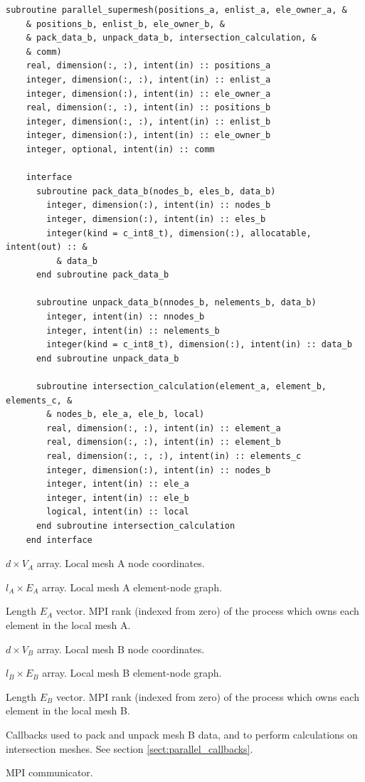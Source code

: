 \documentclass{article}
\begin{document}
\begin{lstlisting}[language=FORTRAN]
  subroutine parallel_supermesh(positions_a, enlist_a, ele_owner_a, &
    & positions_b, enlist_b, ele_owner_b, &
    & pack_data_b, unpack_data_b, intersection_calculation, &
    & comm)
    real, dimension(:, :), intent(in) :: positions_a
    integer, dimension(:, :), intent(in) :: enlist_a
    integer, dimension(:), intent(in) :: ele_owner_a
    real, dimension(:, :), intent(in) :: positions_b
    integer, dimension(:, :), intent(in) :: enlist_b
    integer, dimension(:), intent(in) :: ele_owner_b
    integer, optional, intent(in) :: comm
    
    interface
      subroutine pack_data_b(nodes_b, eles_b, data_b)
        integer, dimension(:), intent(in) :: nodes_b
        integer, dimension(:), intent(in) :: eles_b
        integer(kind = c_int8_t), dimension(:), allocatable, intent(out) :: &
          & data_b
      end subroutine pack_data_b

      subroutine unpack_data_b(nnodes_b, nelements_b, data_b)
        integer, intent(in) :: nnodes_b
        integer, intent(in) :: nelements_b
        integer(kind = c_int8_t), dimension(:), intent(in) :: data_b
      end subroutine unpack_data_b
      
      subroutine intersection_calculation(element_a, element_b, elements_c, &
        & nodes_b, ele_a, ele_b, local)
        real, dimension(:, :), intent(in) :: element_a
        real, dimension(:, :), intent(in) :: element_b
        real, dimension(:, :, :), intent(in) :: elements_c
        integer, dimension(:), intent(in) :: nodes_b
        integer, intent(in) :: ele_a
        integer, intent(in) :: ele_b
        logical, intent(in) :: local
      end subroutine intersection_calculation
    end interface
\end{lstlisting}

\begin{description}[font=\ttfamily\bfseries,leftmargin=2.2\parindent,labelindent=1.7\parindent,noitemsep]
  \item[positions\_a] $d \times V_A$ array. Local mesh A node coordinates.
  \item[enlist\_a] $l_A \times E_A$ array. Local mesh A element-node graph.
  \item[ele\_owner\_a] Length $E_A$ vector. MPI rank (indexed from zero) of the
    process which owns each element in the local mesh A.
  \item[positions\_b] $d \times V_B$ array. Local mesh B node coordinates.
  \item[enlist\_b] $l_B \times E_B$ array. Local mesh B element-node graph.
  \item[ele\_owner\_b] Length $E_B$ vector. MPI rank (indexed from zero) of the
    process which owns each element in the local mesh B.
  \item[pack\_data\_b, unpack\_data\_b, intersection\_calculation] Callbacks
    used to pack and unpack mesh B data, and to perform calculations on
    intersection meshes. See section \ref{sect:parallel_callbacks}.
  \item[comm] MPI communicator.
\end{description}
\end{document}
